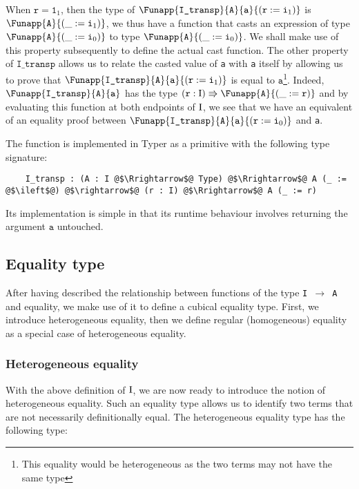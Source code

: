 \documentclass[12pt,twoside,maitrise]{dms}
\theoremstyle{definition}
\numberwithin{equation}{section}
\numberwithin{table}{chapter}
\numberwithin{figure}{chapter}
\newcommand\id[1] {\texttt{#1}}
\newcommand\fn[1] {\texttt{#1}}
\begin{document}
When $\id{r} = \id{1}_1$, then the type of
$\Funapp{\id{I\_transp}}{\id{A}}{\id{a}}{(\earg{\id{r}}{\id{i}_1})}$ is
$\Funapp{\id{A}}{(\earg{\id{i}_1})}$, we thus have a function that casts an
expression of type $\Funapp{\id{A}}{(\earg{\id{i}_0})}$ to type
$\Funapp{\id{A}}{(\earg{\id{i}_0})}$. We shall make use of this property
subsequently to define the actual cast function. The other property of
$\id{I\_transp}$ allows us to relate the casted value of \id{a} with \id{a}
itself by allowing us to prove that
$\Funapp{\id{I\_transp}}{\id{A}}{\id{a}}{(\earg{\id{r}}{\id{i}_1})}$ is equal to
$\id{a}$\footnote{This equality would be heterogeneous as the two terms may not
have the same type}. Indeed, $\Funapp{\id{I\_transp}}{\id{A}}{\id{a}}$ has the
type $(\id{r} : \bI) \Rrightarrow \Funapp{\id{A}}{(\earg{\id{r}})}$ and by
evaluating this function at both endpoints of $\mathrm{I}$, we see that we have an
equivalent of an equality proof between
$\Funapp{\id{I\_transp}}{\id{A}}{\id{a}}{(\earg{\id{r}}{\id{i}_0})}$ and \id{a}.

The function is implemented in Typer as a primitive with the following type
signature:

\begin{verbatim}
    I_transp : (A : I @$\Rrightarrow$@ Type) @$\Rrightarrow$@ A (_ := @$\ileft$@) @$\rightarrow$@ (r : I) @$\Rrightarrow$@ A (_ := r)
\end{verbatim}

Its implementation is simple in that its runtime behaviour involves returning
the argument $\id{a}$ untouched.

\subsection{Equality type}\label{sec:identity}

After having described the relationship between functions of the type \fn{I
  $\rightarrow$ A} and equality, we make use of it to define a cubical equality
type. First, we introduce heterogeneous equality, then we define regular
(homogeneous) equality as a special case of heterogeneous equality.

\subsubsection{Heterogeneous equality}
With the above definition of $\mathrm{I}$, we are now ready to introduce the notion of
heterogeneous equality. Such an equality type allows us to identify two terms
that are not necessarily definitionally equal. The heterogeneous equality type
has the following type:
\end{document}
